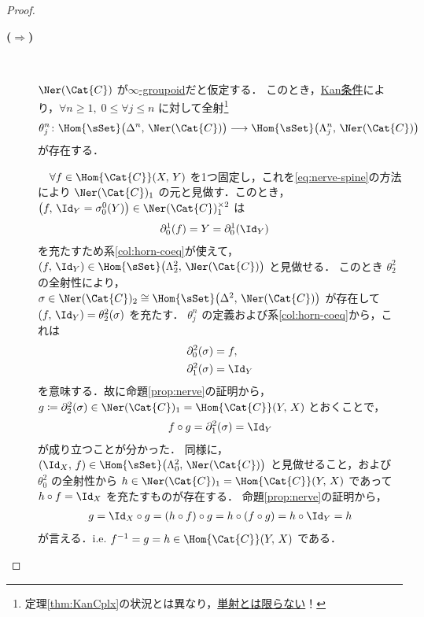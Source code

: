 \documentclass[TQFT_main]{subfiles}
\begin{document}
\begin{proof}
    \begin{description}
        \item[\textbf{($\bm{\Longrightarrow}$)}]　
        
        $\Ner (\Cat{C})$ が\hyperref[def:infinity-1]{$\infty$-groupoid}だと仮定する．
        このとき，\hyperref[def:KanCplx]{Kan条件}により，$\forall n \ge 1,\; 0 \le \forall j \le n$ に対して全射\footnote{定理\ref{thm:KanCplx}の状況とは異なり，\underline{単射とは限らない}！}
        \begin{align}
            \theta^n_j \colon \Hom{\sSet}\bigl(\Delta^n,\,\Ner (\Cat{C})\bigr) &\lto \Hom{\sSet}\bigl(\Lambda_j^n,\,\Ner (\Cat{C})\bigr)
        \end{align}
        が存在する．

        　$\forall f \in \Hom{\Cat{C}}(X,\, Y)$ を1つ固定し，これを\eqref{eq:nerve-spine}の方法により $\Ner (\Cat{C})_1$ の元と見做す．このとき，$\bigl(f,\, \Id_Y = \sigma^0_0(Y)\bigr) \in \Ner (\Cat{C})_1^{\times 2}$ は
        \begin{align}
            \partial^1_0(f) &= Y = \partial^1_0(\Id_Y)
        \end{align}
        を充たすため系\ref{col:horn-coeq}が使えて，$(f,\, \Id_Y) \in \Hom{\sSet}\bigl(\Lambda^2_2,\, \Ner (\Cat{C})\bigr)$ と見做せる．
        このとき $\theta^2_2$ の全射性により，$\sigma \in \Ner (\Cat{C})_2 \cong \Hom{\sSet} \bigl( \Delta^2,\, \Ner (\Cat{C}) \bigr)$ が存在して $(f,\, \Id_Y) = \theta^2_2(\sigma)$ を充たす．
        $\theta^n_j$ の定義および系\ref{col:horn-coeq}から，これは
        \begin{align}
            \partial^2_0 (\sigma) &= f, \\
            \partial^2_1 (\sigma) &= \Id_Y
        \end{align}
        を意味する．故に命題\ref{prop:nerve}の証明から，$g \coloneqq \partial^2_2 (\sigma) \in \Ner (\Cat{C})_1 = \Hom{\Cat{C}}(Y,\, X)$ とおくことで，
        \begin{align}
            f \circ g = \partial^2_1 (\sigma) = \Id_Y
        \end{align}
        が成り立つことが分かった．
        同様に，$(\Id_X,\, f) \in \Hom{\sSet}\bigl(\Lambda^2_0,\, \Ner (\Cat{C})\bigr)$ と見做せること，および $\theta^2_0$ の全射性から $h \in \Ner (\Cat{C})_1 = \Hom{\Cat{C}} (Y,\, X)$ であって $h \circ f = \Id_X$ を充たすものが存在する．
        命題\ref{prop:nerve}の証明から，
        \begin{align}
            g = \Id_X \circ g = (h \circ f) \circ g = h \circ (f \circ g) = h \circ \Id_Y = h
        \end{align}
        が言える．i.e. $f^{-1} = g = h \in \Hom{\Cat{C}}(Y,\, X)$ である．


\end{description}
\end{proof}
\end{document}
